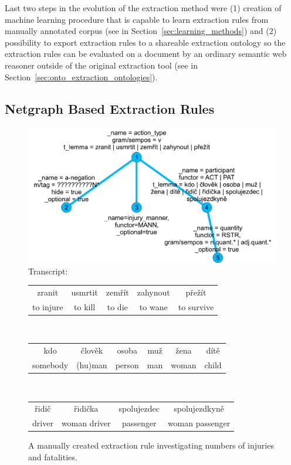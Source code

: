 Last two steps in the evolution of the extraction method were (1) creation of machine learning procedure that is capable to learn extraction rules from manually annotated corpus (see in Section~\ref{sec:learning_methods}) and (2) possibility to export extraction rules to a shareable extraction ontology so the extraction rules can be evaluated on a document by an ordinary semantic web reasoner outside of the original extraction tool (see in Section~\ref{sec:onto_extraction_ontologies}).


\subsection{Netgraph Based Extraction Rules} \label{sec:manual_Netgraph_Based_Extraction_Rules_method}

\begin{figure}
	\centering
		\includegraphics[width=0.7\hsize]{extract_patern}		
\\Transcript:\\
\begin{tabular}{|c|c|c|c|c|}
\hline
zranit & usmrtit & zemřít & zahynout & přežít\\
to injure & to kill & to die & to wane & to survive\\
\hline
\end{tabular}
\\\begin{tabular}{|c|c|c|c|c|c|}
\hline
kdo & člověk & osoba & muž & žena & dítě\\
somebody & (hu)man & person & man & woman & child\\
\hline
\end{tabular}
\\\begin{tabular}{|c|c|c|c|}
\hline
řidič & řidička & spolujezdec & spolujezdkyně\\
driver & woman driver & passenger & woman passenger\\	
\hline
\end{tabular}		
	\caption{A manually created extraction rule investigating numbers of injuries and fatalities.}
	\label{fig:manual_extract_patern}
\end{figure}



